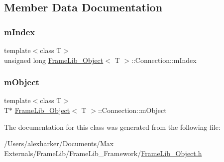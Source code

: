 \subsection{Member Data Documentation}
\mbox{\label{struct_frame_lib___object_1_1_connection_af1a05bc9dc0a0cee180992dcd2638189}} 
\subsubsection{\texorpdfstring{m\+Index}{mIndex}}
{\footnotesize\ttfamily template$<$class T$>$ \\
unsigned long \hyperlink{class_frame_lib___object}{Frame\+Lib\+\_\+\+Object}$<$ T $>$\+::Connection\+::m\+Index}

\mbox{\label{struct_frame_lib___object_1_1_connection_aef813814b61e0607303a3aa69d896e01}} 
\subsubsection{\texorpdfstring{m\+Object}{mObject}}
{\footnotesize\ttfamily template$<$class T$>$ \\
T$\ast$ \hyperlink{class_frame_lib___object}{Frame\+Lib\+\_\+\+Object}$<$ T $>$\+::Connection\+::m\+Object}



The documentation for this class was generated from the following file\+:\begin{DoxyCompactItemize}
\item 
/\+Users/alexharker/\+Documents/\+Max Externals/\+Frame\+Lib/\+Frame\+Lib\+\_\+\+Framework/\hyperlink{_frame_lib___object_8h}{Frame\+Lib\+\_\+\+Object.\+h}\end{DoxyCompactItemize}
